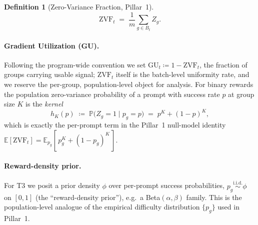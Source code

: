\documentclass[11pt]{article}
\theoremstyle{plain}
\theoremstyle{definition}
\newtheorem{definition}{Definition}
\theoremstyle{remark}
\newcommand{\ZVF}{\ensuremath{\mathrm{ZVF}}}
\newcommand{\GU}{\ensuremath{\mathrm{GU}}}
\newcommand{\E}{\mathbb{E}}
\newcommand{\Prob}{\mathbb{P}}
\newcommand{\1}{\mathbb{1}}
\begin{document}
\begin{definition}[Zero-Variance Fraction, Pillar~1]\label{def:zvf}
\[
\ZVF_t \;=\; \frac{1}{m}\sum_{g\in B_t} Z_g .
\]
\end{definition}

\paragraph{Gradient Utilization (GU).} Following the program-wide convention
we set $\GU_t \coloneqq 1-\ZVF_t$, the fraction of groups carrying usable
signal; $\ZVF_t$ itself is the batch-level uniformity rate, and we reserve
the per-group, population-level object for analysis. For binary rewards the population zero-variance probability of a
prompt with success rate $p$ at group size $K$ is the \emph{kernel}
\begin{equation}\label{eq:kernel}
h_K(p) \;\coloneqq\; \Prob\big(Z_g = 1 \mid p_g=p\big) \;=\; p^{K} + (1-p)^{K},
\end{equation}
which is exactly the per-prompt term in the Pillar~1 null-model identity
$\E[\ZVF_t] = \E_{p_g}[\,p_g^{K} + (1-p_g)^{K}\,]$.

\paragraph{Reward-density prior.} For T3 we posit a prior density $\phi$ over
per-prompt success probabilities, $p_g \overset{\text{i.i.d.}}{\sim}\phi$ on
$[0,1]$ (the ``reward-density prior''), e.g.\ a Beta$(\alpha,\beta)$ family.
This is the population-level analogue of the empirical difficulty distribution
$\{p_g\}$ used in Pillar~1.
\end{document}
